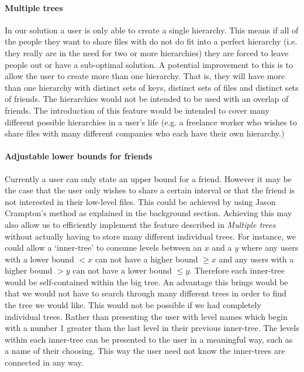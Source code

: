\documentclass[12pt, titlepage]{article}
\begin{document}
\paragraph*{Multiple trees} In our solution a user is only able to create a single hierarchy. This means if all of the people they want to share files with do not do fit into a perfect hierarchy (i.e. they really are in the need for two or more hierarchies) they are forced to leave people out or have a sub-optimal solution. A potential improvement to this is to allow the user to create more than one hierarchy. That is, they will have more than one hierarchy with distinct sets of keys, distinct sets of files and distinct sets of friends. The hierarchies would not be intended to be used with an overlap of friends. The introduction of this feature would be intended to cover many different possible hierarchies in a user's life (e.g. a freelance worker who wishes to share files with many different companies who each have their own hierarchy.)
\paragraph*{Adjustable lower bounds for friends} Currently a user can only state an upper bound for a friend. However it may be the case that the user only wishes to share a certain interval or that the friend is not interested in their low-level files. This could be achieved by using Jason Crampton's method as explained in the background section. Achieving this may also allow us to efficiently implement the feature described in \textit{Multiple trees} without actually having to store many different individual trees. For instance, we could allow a `inner-tree' to consume levels between an $x$ and a $y$ where any users with a lower bound $< x$ can not have a higher bound $\geq x$ and any users with a higher bound $> y$ can not have a lower bound $\leq y$. Therefore each inner-tree would be self-contained within the big tree. An advantage this brings would be that we would not have to search through many different trees in order to find the tree we would like. This would not be possible if we had completely individual trees.
\newline \indent Rather than presenting the user with level names which begin with a number 1 greater than the last level in their previous inner-tree. The levels within each inner-tree can be presented to the user in a meaningful way, such as a name of their choosing. This way the user need not know the inner-trees are connected in any way.
\end{document}
